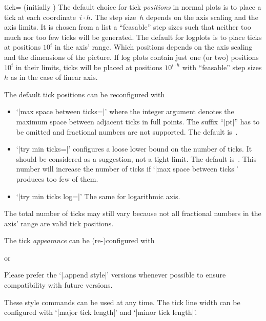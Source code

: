 \begin{pgfplotsxykey}{\x tick= (initially \marg{})}
\noindent
The default choice for tick \emph{positions} in normal plots is to place a tick at each coordinate~$i\cdot h$. The step size~$h$ depends on the axis scaling and the axis limits. It is chosen from a list a ``feasable'' step sizes such that neither too much nor too few ticks will be generated. The default for logplots is to place ticks at positions $10^i$ in the axis' range. Which positions depends on the axis scaling and the dimensions of the picture. If log plots contain just one (or two) positions $10^i$ in their limits, ticks will be placed at positions $10^{i\cdot h}$ with ``feasable'' step sizes $h$ as in the case of linear axis.

The default tick positions can be reconfigured with
\begin{itemize}
	\item `|max space between ticks=|' where the integer argument denotes the maximum space between adjacent ticks in full points. The suffix ``|pt|'' has to be omitted and fractional numbers are not supported. The default is~\axisdefaulttickwidth.
	\item `|try min ticks=|' configures a loose lower bound on the number of ticks. It should be considered as a suggestion, not a tight limit. The default is~\axisdefaulttryminticks. This number will increase the number of ticks if `|max space between ticks|' produces too few of them.
	\item `|try min ticks log=|' The same for logarithmic axis.
\end{itemize}
The total number of ticks may still vary because not all fractional numbers in the axis' range are valid tick positions.


\noindent
The tick \emph{appearance} can be (re-)configured with
\begin{codeexample}
\end{codeexample}
or
\begin{codeexample}
\end{codeexample}
Please prefer the `|.append style|' versions whenever possible to ensure compatibility with future versions.

These style commands can be used at any time. The tick line width can be configured with `|major tick length|' and `|minor tick length|'.


\end{pgfplotsxykey}
